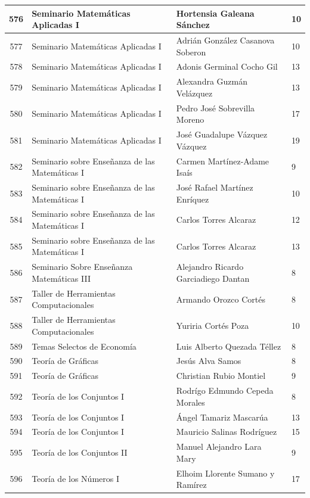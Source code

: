 {\begin{longtable}{|c|p{6.5cm}|p{5cm}|p{1.5cm}|}
  576 & Seminario Matemáticas Aplicadas I & Hortensia Galeana Sánchez & 10 \\ \hline
  577 & Seminario Matemáticas Aplicadas I & Adrián González Casanova Soberon & 10 \\ \hline
  578 & Seminario Matemáticas Aplicadas I & Adonis Germinal Cocho Gil & 13 \\ \hline
  579 & Seminario Matemáticas Aplicadas I & Alexandra Guzmán Velázquez & 13 \\ \hline
  580 & Seminario Matemáticas Aplicadas I & Pedro José Sobrevilla Moreno & 17 \\ \hline
  581 & Seminario Matemáticas Aplicadas I & José Guadalupe Vázquez Vázquez & 19 \\ \hline
  582 & Seminario sobre Enseñanza de las Matemáticas I & Carmen Martínez-Adame Isaís & 9 \\ \hline
  583 & Seminario sobre Enseñanza de las Matemáticas I & José Rafael Martínez Enríquez & 10 \\ \hline
  584 & Seminario sobre Enseñanza de las Matemáticas I & Carlos Torres Alcaraz & 12 \\ \hline
  585 & Seminario sobre Enseñanza de las Matemáticas I & Carlos Torres Alcaraz & 13 \\ \hline
  586 & Seminario Sobre Enseñanza Matemáticas III & Alejandro Ricardo Garciadiego Dantan & 8 \\ \hline
  587 & Taller de Herramientas Computacionales & Armando Orozco Cortés & 8 \\ \hline
  588 & Taller de Herramientas Computacionales & Yuriria Cortés Poza & 10 \\ \hline
  589 & Temas Selectos de Economía & Luis Alberto Quezada Téllez & 8 \\ \hline
  590 & Teoría de Gráficas & Jesús Alva Samos & 8 \\ \hline
  591 & Teoría de Gráficas & Christian Rubio Montiel & 9 \\ \hline
  592 & Teoría de los Conjuntos I & Rodrígo Edmundo Cepeda Morales & 8 \\ \hline
  593 & Teoría de los Conjuntos I & Ángel Tamariz Mascarúa & 13 \\ \hline
  594 & Teoría de los Conjuntos I & Mauricio Salinas Rodríguez & 15 \\ \hline
  595 & Teoría de los Conjuntos II & Manuel Alejandro Lara Mary & 9 \\ \hline
  596 & Teoría de los Números I & Elhoim Llorente Sumano y Ramírez & 17 \\ \hline

\end{longtable}}

